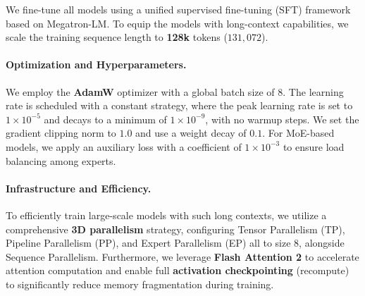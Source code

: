 \documentclass{article}
\theoremstyle{plain}
\theoremstyle{definition}
\theoremstyle{remark}
\begin{document}
We fine-tune all models using a unified supervised fine-tuning (SFT) framework based on Megatron-LM. To equip the models with long-context capabilities, we scale the training sequence length to \textbf{128k} tokens ($131,072$).

\paragraph{Optimization and Hyperparameters.}
We employ the \textbf{AdamW} optimizer with a global batch size of $8$. The learning rate is scheduled with a constant strategy, where the peak learning rate is set to $1\times 10^{-5}$ and decays to a minimum of $1\times 10^{-9}$, with no warmup steps. We set the gradient clipping norm to $1.0$ and use a weight decay of $0.1$. For MoE-based models, we apply an auxiliary loss with a coefficient of $1\times 10^{-3}$ to ensure load balancing among experts.

\paragraph{Infrastructure and Efficiency.}
To efficiently train large-scale models with such long contexts, we utilize a comprehensive \textbf{3D parallelism} strategy, configuring Tensor Parallelism (TP), Pipeline Parallelism (PP), and Expert Parallelism (EP) all to size $8$, alongside Sequence Parallelism. Furthermore, we leverage \textbf{Flash Attention 2} to accelerate attention computation and enable full \textbf{activation checkpointing} (recompute) to significantly reduce memory fragmentation during training.
\end{document}
